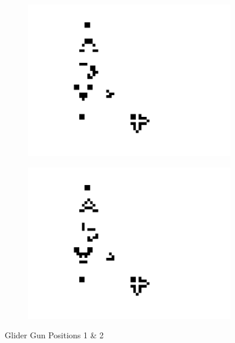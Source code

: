 \documentclass[11pt]{article}
\begin{document}
\begin{figure}[!ht]
	\centering
	\begin{subfigure}{.45\textwidth}
		\centering
  	  	\includegraphics[width=1\linewidth]{images/glider_gun1.png}
  	  	\label{fig:glider_gun1}
	\end{subfigure}
	\begin{subfigure}{.45\textwidth}
  	  	\centering
  	  	\includegraphics[width=1\linewidth]{images/glider_gun2.png}
  	  	\label{fig:glider_gun2}
	\end{subfigure}
	\caption{Glider Gun Positions 1 \& 2}
	\label{fig:glider_gun}
\end{figure}
\end{document}
